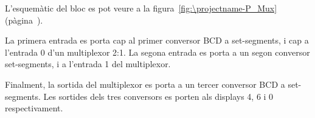 L'esquemàtic del bloc es pot veure a la figura~\ref{fig:\projectname-P_Mux} (pàgina~\pageref{fig:\projectname-P_Mux}).

La primera entrada es porta cap al primer conversor BCD a set-segments, i cap a l'entrada 0 d'un multiplexor 2:1. La segona entrada es porta a un segon conversor set-segments, i a l'entrada 1 del multiplexor.

Finalment, la sortida del multiplexor es porta a un tercer conversor BCD a set-segments. Les sortides dels tres conversors es porten als displays 4, 6 i 0 respectivament.

\vspace{1cm}
